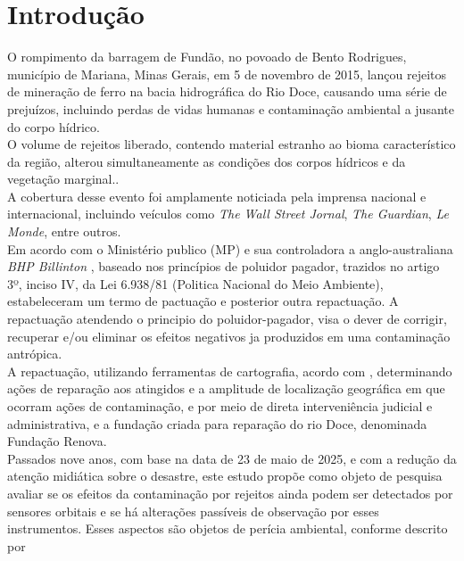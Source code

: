 
\section{Introdução}

\hspace*{1.25 cm} O rompimento da barragem de Fundão, no povoado de Bento Rodrigues, município de Mariana, Minas Gerais, em 5 de novembro de 2015, lançou rejeitos de mineração de ferro na bacia hidrográfica do Rio Doce, causando uma série de prejuízos, incluindo perdas de vidas humanas e contaminação ambiental a jusante do corpo hídrico. \\
%
\hspace*{1.25 cm} O volume de rejeitos liberado, contendo material estranho ao bioma característico da região, alterou simultaneamente as condições dos corpos hídricos e da vegetação marginal..\\
%
\hspace*{1.25 cm}A cobertura desse evento foi amplamente noticiada pela imprensa nacional e internacional, incluindo veículos como \textit{The Wall Street Jornal}, \textit{The Guardian}, \textit{Le Monde}, entre outros.\\
%
\hspace*{1.25 cm} Em acordo com o Ministério publico (MP) e sua controladora a anglo-australiana  \textit{BHP Billinton} ,  baseado nos princípios de poluidor pagador, trazidos no artigo 3º, inciso IV, da Lei 6.938/81 (Politica Nacional do Meio Ambiente), estabeleceram um termo de pactuação e posterior outra repactuação.  A repactuação atendendo o principio do poluidor-pagador, visa o dever de corrigir, recuperar e/ou eliminar os efeitos negativos ja produzidos em uma contaminação antrópica. \\
% 
\hspace*{1.25 cm}  A repactuação, utilizando ferramentas de cartografia, acordo com \cite[p~79]{Magri}, determinando ações de reparação aos atingidos e a  amplitude de localização geográfica em que ocorram ações de contaminação, e  por meio de direta interveniência  judicial e administrativa, e a fundação criada para reparação do rio Doce, denominada Fundação Renova.\\
\hspace*{1.25 cm} Passados nove anos, com base na data de 23 de maio de 2025, e com a redução da atenção midiática sobre o desastre, este estudo propõe como objeto de pesquisa avaliar se os efeitos da contaminação por rejeitos ainda podem ser detectados por sensores orbitais e se há alterações passíveis de observação por esses instrumentos. Esses aspectos são objetos de perícia ambiental, conforme descrito por   \cite[p.130]{Arantes} \\
